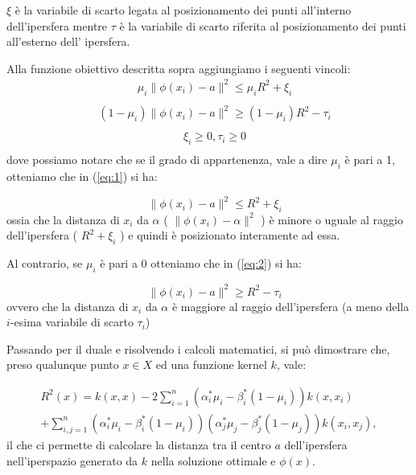 \documentclass[12pt,italian]{report}
\begin{document}
$ \xi $ è la variabile di scarto legata al posizionamento dei punti all'interno dell'ipersfera mentre $ \tau $ è la variabile di scarto riferita al posizionamento dei punti all'esterno dell' ipersfera.

Alla funzione obiettivo descritta sopra aggiungiamo i seguenti vincoli:
\begin{equation}
\label{eq:1}
\begin{aligned}
\quad \mu_{i} \lVert \phi(x_{i}) - a \rVert ^2 \leq \mu_{i} R^2 + \xi_{i}\\
\end{aligned}
\end{equation}
\begin{equation}
\label{eq:2}
\begin{aligned}
\quad (1 - \mu_{i}) \lVert \phi(x_{i}) - a \rVert ^2 \geq (1 - \mu_{i})R^2 - \tau_{i} \\
\end{aligned}
\end{equation}
\begin{equation}
\label{eq:3}
\begin{aligned}
\quad \xi_{i} \geq 0, \tau_{i} \geq 0 \\
\end{aligned}
\end{equation}
dove possiamo notare che se il grado di appartenenza, vale a dire $  \mu_{i} $ è pari a 1, otteniamo che in (\ref{eq:1}) si ha:

\[\quad \lVert \phi(x_{i}) - a \rVert ^2 \leq R^2 + \xi_{i} \]
ossia che la distanza di $ x_{i} $ da $\alpha$ ( $\lVert \phi(x_{i}) - \alpha \rVert ^2$ ) è minore o uguale al raggio dell'ipersfera ( $R^2 + \xi_{i}$ ) e quindi è posizionato interamente ad essa.

Al contrario, se $ \mu_{i} $ è pari a $ 0 $ otteniamo che in (\ref{eq:2}) si ha:

\[ \quad \lVert \phi(x_{i}) - a \rVert ^2 \geq R^2 - \tau_{i} \]
ovvero che la distanza di $ x_{i} $ da $\alpha$  è maggiore al raggio dell'ipersfera (a meno della $i$-esima variabile di scarto $\tau_{i}$)

Passando per il duale e risolvendo i calcoli matematici, si può dimostrare che, preso qualunque punto $x \in X$ ed una funzione kernel $k$, vale:

\begin{equation}
\begin{split}
R^2(x) = k(x, x) - 2\sum_{i=1}^{n} (\alpha_{i}^* \mu_{i} - \beta_{i}^*(1-\mu_{i}))k(x, x_{i}) \\+ \sum_{i,j = 1}^{n}(\alpha_{i}^* \mu_{i} - \beta_{i}^*(1-\mu_{i}))(\alpha_{j}^* \mu_{j} - \beta_{j}^*(1-\mu_{j}))k(x_{i}, x_{j}),
\end{split}
\end{equation}
il che ci permette di calcolare la distanza tra il centro $a$ dell'ipersfera nell'iperspazio generato da $k$ nella soluzione ottimale e $\phi(x)$.
\end{document}
